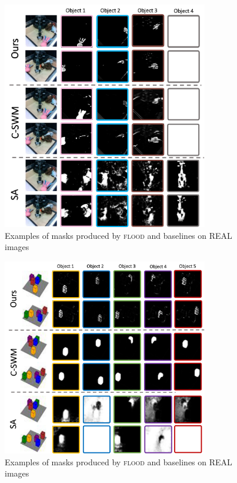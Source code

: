 \documentclass{article}
\begin{document}
\begin{figure}
  \centering
  \includegraphics[width=9cm]{figs/qual_real.pdf}
  \caption{Examples of masks produced by \textsc{flood} and baselines on REAL images}
  \label{fig:qual_real}
\end{figure}

\begin{figure}
  \centering
  \includegraphics[width=9cm]{figs/qual_cubes.pdf}
  \caption{Examples of masks produced by \textsc{flood} and baselines on REAL images}
  \label{fig:qual_real}
\end{figure}

\end{document}
